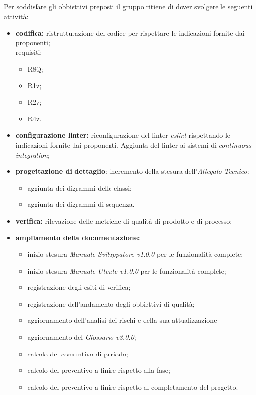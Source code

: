 Per soddisfare gli obbiettivi preposti il gruppo ritiene di dover svolgere le seguenti attività:
\begin{itemize}
    \item \textbf{codifica:} ristrutturazione del codice per rispettare le indicazioni fornite dai proponenti;\\ requisiti:
          \begin{itemize}
              \item R8Q;
              \item R1v;
              \item R2v;
              \item R4v.
          \end{itemize}
    \item \textbf{configurazione linter:} riconfigurazione del linter \textit{eslint} rispettando le indicazioni fornite dai proponenti. Aggiunta del linter ai sistemi di \textit{continuous integration};
    \item \textbf{progettazione di dettaglio}: incremento della stesura dell'\textit{Allegato Tecnico}:
          \begin{itemize}
              \item aggiunta dei digrammi delle classi;
              \item aggiunta dei digrammi di sequenza.
          \end{itemize}
    \item \textbf{verifica:} rilevazione delle metriche di qualità di prodotto e di processo;
    \item \textbf{ampliamento della documentazione:}
          \begin{itemize}
              \item inizio stesura \textit{Manuale Sviluppatore v1.0.0} per le funzionalità complete;
              \item inizio stesura \textit{Manuale Utente v1.0.0} per le funzionalità complete;
              \item registrazione degli esiti di verifica;
              \item registrazione dell'andamento degli obbiettivi di qualità;
              \item aggiornamento dell'analisi dei rischi e della sua attualizzazione
              \item aggiornamento del \textit{Glossario v3.0.0};
              \item calcolo del consuntivo di periodo;
              \item calcolo del preventivo a finire rispetto alla fase;
              \item calcolo del preventivo a finire rispetto al completamento del progetto.
          \end{itemize}
\end{itemize}

